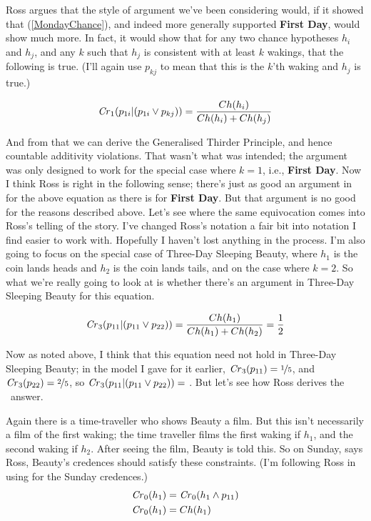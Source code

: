 Ross argues that the style of argument we've been considering would, if it showed that (\ref{MondayChance}), and indeed more generally supported \textbf{First Day}, would show much more. In fact, it would show that for any two chance hypotheses $h_i$ and $h_j$, and any $k$ such that $h_j$ is consistent with at least $k$ wakings, that the following is true. (I'll again use $p_{kj}$ to mean that this is the $k$'th waking and $h_j$ is true.)

\begin{equation}
\text{\textit{Cr}}_1(p_{1i} | (p_{1i} \vee p_{kj})) = \frac{Ch(h_i)}{Ch(h_i) + Ch(h_j)}
\end{equation}

\noindent And from that we can derive the Generalised Thirder Principle, and hence countable additivity violations. That wasn't what was intended; the argument was only designed to work for the special case where $k = 1$, i.e., \textbf{First Day}. Now I think Ross is right in the following sense; there's just as good an argument in \citet{Weatherson-SoSB} for the above equation as there is for \textbf{First Day}. But that argument is no good for the reasons described above. Let's see where the same equivocation comes into Ross's telling of the story. I've changed Ross's notation a fair bit into notation I find easier to work with. Hopefully I haven't lost anything in the process. I'm also going to focus on the special case of Three-Day Sleeping Beauty, where $h_1$ is the coin lands heads and $h_2$ is the coin lands tails, and on the case where $k = 2$. So what we're really going to look at is whether there's an argument in Three-Day Sleeping Beauty for this equation.

\begin{equation}
\text{\textit{Cr}}_3(p_{11} | (p_{11} \vee p_{22})) = \frac{Ch(h_1)}{Ch(h_1) + Ch(h_2)} = \frac{1}{2}
\end{equation}

\noindent Now as noted above, I think that this equation need not hold in Three-Day Sleeping Beauty; in the model I gave for it earlier, $\text{\textit{Cr}}_3(p_{11}) = \nicefrac{1}{5}$, and $\text{\textit{Cr}}_3(p_{22}) = \nicefrac{2}{5}$, so $\text{\textit{Cr}}_3(p_{11} | (p_{11} \vee p_{22})) =$ \third. But let's see how Ross derives the \half\ answer.

Again there is a time-traveller who shows Beauty a film. But this isn't necessarily a film of the first waking; the time traveller films the first waking if $h_1$, and the second waking if $h_2$. After seeing the film, Beauty is told this. So on Sunday, says Ross, Beauty's credences should satisfy these constraints. (I'm following Ross in using  for the Sunday credences.)
\begin{align}
\text{\textit{Cr}}_0(h_1) &= \text{\textit{Cr}}_0(h_1 \wedge p_{11}) \\
\text{\textit{Cr}}_0(h_1) &= Ch(h_1)
\end{align}

